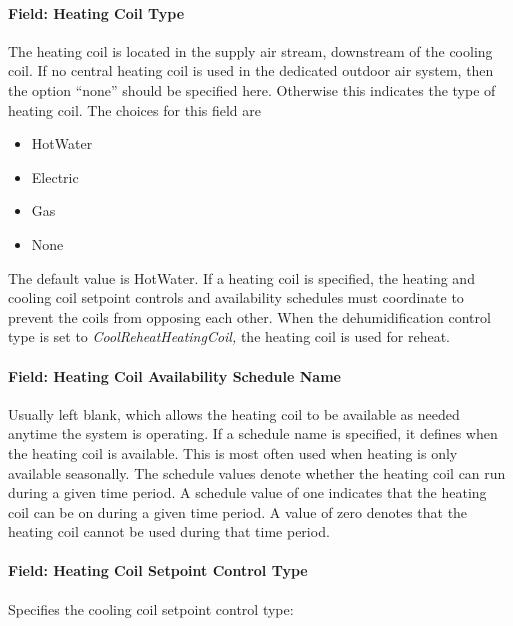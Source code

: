 \paragraph{Field: Heating Coil Type}\label{field-heating-coil-type-8}

The heating coil is located in the supply air stream, downstream of the cooling coil. If no central heating coil is used in the dedicated outdoor air system, then the option ``none'' should be specified here. Otherwise this indicates the type of heating coil. The choices for this field are

\begin{itemize}
\item
  HotWater
\item
  Electric
\item
  Gas
\item
  None
\end{itemize}

The default value is HotWater. If a heating coil is specified, the heating and cooling coil setpoint controls and availability schedules must coordinate to prevent the coils from opposing each other. When the dehumidification control type is set to \emph{CoolReheatHeatingCoil,} the heating coil is used for reheat.

\paragraph{Field: Heating Coil Availability Schedule Name}\label{field-heating-coil-availability-schedule-name-8}

Usually left blank, which allows the heating coil to be available as needed anytime the system is operating. If a schedule name is specified, it defines when the heating coil is available. This is most often used when heating is only available seasonally. The schedule values denote whether the heating coil can run during a given time period. A schedule value of one indicates that the heating coil can be on during a given time period. A value of zero denotes that the heating coil cannot be used during that time period.

\paragraph{Field: Heating Coil Setpoint Control Type}\label{field-heating-coil-setpoint-control-type-2}

Specifies the cooling coil setpoint control type:

